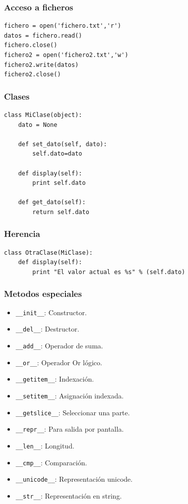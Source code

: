 \documentclass[10pt]{beamer}
\begin{document}
  \begin{frame}[containsverbatim]
    \frametitle{Acceso a ficheros}
    \begin{verbatim}
fichero = open('fichero.txt','r')
datos = fichero.read()
fichero.close()
fichero2 = open('fichero2.txt','w')
fichero2.write(datos)
fichero2.close()
    \end{verbatim}
  \end{frame}

  \begin{frame}[containsverbatim]
    \frametitle{Clases}
    \begin{verbatim}
class MiClase(object):
    dato = None

    def set_dato(self, dato):
        self.dato=dato

    def display(self):
        print self.dato

    def get_dato(self):
        return self.dato
    \end{verbatim}
  \end{frame}

  \begin{frame}[containsverbatim]
    \frametitle{Herencia}
    \begin{verbatim}
class OtraClase(MiClase):
    def display(self):
        print "El valor actual es %s" % (self.dato)
    \end{verbatim}
  \end{frame}

  \begin{frame}[containsverbatim]
    \frametitle{Metodos especiales}
    \begin{itemize}
      \item \verb+__init__+: Constructor.
      \item \verb+__del__+: Destructor.
      \item \verb+__add__+: Operador de suma.
      \item \verb+__or__+: Operador Or lógico.
      \item \verb+__getitem__+: Indexación.
      \item \verb+__setitem__+: Asignación indexada.
      \item \verb+__getslice__+: Seleccionar una parte.
      \item \verb+__repr__+: Para salida por pantalla.
      \item \verb+__len__+: Longitud.
      \item \verb+__cmp__+: Comparación.
      \item \verb+__unicode__+: Representación unicode.
      \item \verb+__str__+: Representación en string.
    \end{itemize}
  \end{frame}
\end{document}
